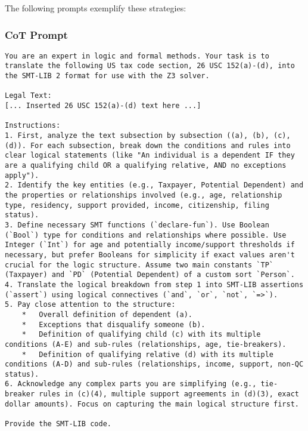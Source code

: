 \documentclass[11pt, letterpaper]{article}
\begin{document}
The following prompts exemplify these strategies:

\subsubsection{CoT Prompt}
\begin{lstlisting}[style=promptstyle, caption={Chain-of-Thought Prompt used for initial SMT generation}]
You are an expert in logic and formal methods. Your task is to translate the following US tax code section, 26 USC 152(a)-(d), into the SMT-LIB 2 format for use with the Z3 solver.

Legal Text:
[... Inserted 26 USC 152(a)-(d) text here ...]

Instructions:
1. First, analyze the text subsection by subsection ((a), (b), (c), (d)). For each subsection, break down the conditions and rules into clear logical statements (like "An individual is a dependent IF they are a qualifying child OR a qualifying relative, AND no exceptions apply").
2. Identify the key entities (e.g., Taxpayer, Potential Dependent) and the properties or relationships involved (e.g., age, relationship type, residency, support provided, income, citizenship, filing status).
3. Define necessary SMT functions (`declare-fun`). Use Boolean (`Bool`) type for conditions and relationships where possible. Use Integer (`Int`) for age and potentially income/support thresholds if necessary, but prefer Booleans for simplicity if exact values aren't crucial for the logic structure. Assume two main constants `TP` (Taxpayer) and `PD` (Potential Dependent) of a custom sort `Person`.
4. Translate the logical breakdown from step 1 into SMT-LIB assertions (`assert`) using logical connectives (`and`, `or`, `not`, `=>`).
5. Pay close attention to the structure:
    *   Overall definition of dependent (a).
    *   Exceptions that disqualify someone (b).
    *   Definition of qualifying child (c) with its multiple conditions (A-E) and sub-rules (relationships, age, tie-breakers).
    *   Definition of qualifying relative (d) with its multiple conditions (A-D) and sub-rules (relationships, income, support, non-QC status).
6. Acknowledge any complex parts you are simplifying (e.g., tie-breaker rules in (c)(4), multiple support agreements in (d)(3), exact dollar amounts). Focus on capturing the main logical structure first.

Provide the SMT-LIB code.
\end{lstlisting}
\end{document}
